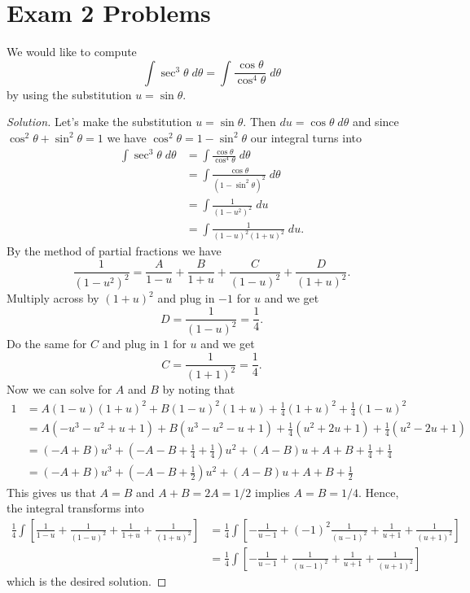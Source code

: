 \section{Exam 2 Problems}
\begin{problem}[Spring 2015, \# 5]
We would like to compute
\[
\int\sec^3\theta\;d\theta=\int\frac{\cos\theta}{\cos^4\theta}\;d\theta
\]
by using the substitution $u=\sin\theta$.
\end{problem}
\begin{proof}[Solution]
Let's make the substitution $u=\sin\theta$. Then $du=\cos\theta\;d\theta$
and since $\cos^2\theta+\sin^2\theta=1$ we have
$\cos^2\theta=1-\sin^2\theta$
our integral turns into
\begin{align*}
\int\sec^3\theta\;d\theta
&=\int\frac{\cos\theta}{\cos^4\theta}\;d\theta\\
&=\int\frac{\cos\theta}{\left(1-\sin^2\theta\right)^2}\;d\theta\\
&=\int\frac{1}{(1-u^2)^2}\;du\\
&=\int\frac{1}{(1-u)^2(1+u)^2}\;du.
\end{align*}
By the method of partial fractions we have
\[
\frac{1}{\left(1-u^2\right)^2}=\frac{A}{1-u}+\frac{B}{1+u}+\frac{C}{(1-u)^2}+\frac{D}{(1+u)^2}.
\]
Multiply across by $(1+u)^2$ and plug in $-1$ for $u$ and we get
\[
D=\frac{1}{(1-u)^2}=\frac{1}{4}.
\]
Do the same for $C$ and plug in $1$ for $u$ and we get
\[
C=\frac{1}{(1+1)^2}=\frac{1}{4}.
\]
Now we can solve for $A$ and $B$ by noting that
\begin{align*}
1&=A(1-u)(1+u)^2+B(1-u)^2(1+u)+\frac{1}{4}(1+u)^2+\frac{1}{4}(1-u)^2\\
 &=A(-u^3-u^2+u+1)+B(u^3-u^2-u+1)+\frac{1}{4}(u^2+2u+1)+\frac{1}{4}(u^2-2u+1)\\
 &=\left(-A+B\right)u^3
   +\left(-A-B+\frac{1}{4}+\frac{1}{4}\right)u^2
   +\left(A-B\right)u
   +A+B+\frac{1}{4}+\frac{1}{4}\\
 &=\left(-A+B\right)u^3
   +\left(-A-B+\frac{1}{2}\right)u^2
   +\left(A-B\right)u
   +A+B+\frac{1}{2}
\end{align*}
This gives us that $A=B$ and $A+B=2A=1/2$ implies $A=B=1/4$. Hence, the
integral transforms into
\begin{align*}
\frac{1}{4}\int\left[\frac{1}{1-u}+\frac{1}{(1-u)^2}+\frac{1}{1+u}+\frac{1}{(1+u)^2}\right]&=
\frac{1}{4}\int\left[-\frac{1}{u-1}+(-1)^2\frac{1}{(u-1)^2}+\frac{1}{u+1}+\frac{1}{(u+1)^2}\right]\\
&=
\boxed{\frac{1}{4}\int\left[-\frac{1}{u-1}+\frac{1}{(u-1)^2}+\frac{1}{u+1}+\frac{1}{(u+1)^2}\right]}
\end{align*}
which is the desired solution.
\end{proof}


